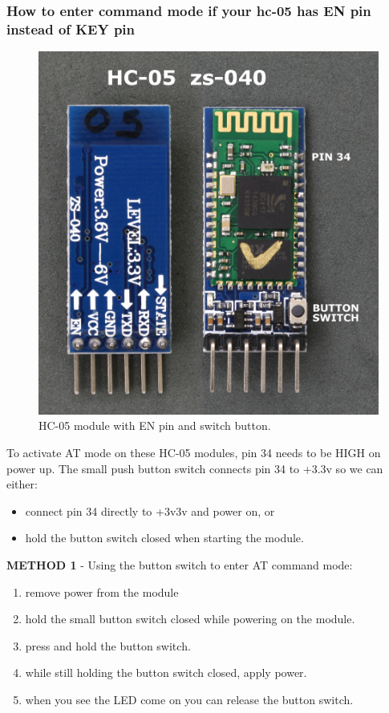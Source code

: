 \subsubsection{How to enter command mode if your hc-05 has EN pin instead of KEY pin}
\begin{figure}[H]
	\centering
	\includegraphics[width=\textwidth]
	{files/images/hc05_en_pin}
	\caption{HC-05 module with EN pin and switch button.}
\end{figure}
To activate AT mode on these HC-05 modules, pin 34 needs to be HIGH on power up. The small push button switch connects pin 34 to +3.3v so we can either:
\begin{itemize}
	\item connect pin 34 directly to +3v3v and power on, or
	\item hold the button switch closed when starting the module.
	
\end{itemize}
\textbf{METHOD 1} - Using the button switch to enter AT command mode:
\begin{enumerate}
	\item remove power from the module
	\item hold the small button switch closed while powering on the module.
	\item press and hold the button switch.
	\item while still holding the button switch closed, apply power.
	\item when you see the LED come on you can release the button switch.
\end{enumerate}
